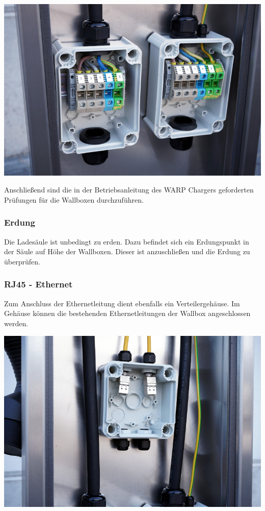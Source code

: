 \documentclass[a4paper,10pt]{article}
\begin{document}
\begin{multicols*}{2}
	\includegraphics[width=\linewidth]{./img/warp-charger-stand-clamps}

	Anschließend sind die in der Betriebsanleitung des WARP Chargers geforderten Prüfungen für die
	Wallboxen durchzuführen.

	\subsubsection{Erdung}
	Die Ladesäule ist unbedingt zu erden. Dazu befindet sich ein Erdungspunkt in
	der Säule auf Höhe der Wallboxen. Dieser ist anzuschließen und die Erdung zu
	überprüfen.

	\subsubsection{RJ45 - Ethernet}
	Zum Anschluss der Ethernetleitung dient ebenfalls ein Verteilergehäuse.
	Im Gehäuse können die bestehenden Ethernetleitungen der Wallbox
	angeschlossen werden.

	\begin{center}
		\includegraphics[width=\linewidth]{./img/warp-charger-stand-eth}
	\end{center}


\end{multicols*}
\end{document}
